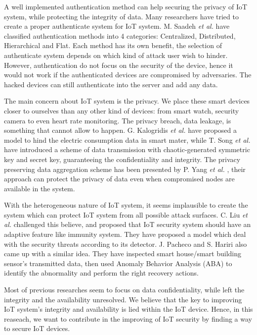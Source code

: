 A well implemented authentication method can help securing the privacy of IoT system, while protecting the integrity of data. Many researchers have tried to create a proper authenticate system for IoT system. M. Saadeh \textit{et al.}\cite{AUTH1} have classified authentication methods into 4 categories: Centralized, Distributed, Hierarchical and Flat. Each method has its own benefit, the selection of authenticate system depends on which kind of attack user wish to hinder. However, authentication do not focus on the security of the device, hence it would not work if the authenticated devices are compromised by adversaries. The hacked devices can still authenticate into the server and add any data. 

 The main concern about IoT system is the privacy. We place these smart devices closer to ourselves than any other kind of devices: from smart watch, security camera to even heart rate monitoring. The privacy breach, data leakage, is something that cannot allow to happen. G. Kalogridis \textit{et al.} \cite{PRIVACY1} have proposed a model to hind the electric consumption data in smart mater, while T. Song \textit{et al.} \cite{PRIVACY2} have introduced a scheme of data transmission with chaotic-generated symmetric key and secret key, guaranteeing the confidentiality and integrity. The privacy preserving data aggregation scheme has been presented by P. Yang \textit{et al.} \cite{PRIVACY3}, their approach can protect the privacy of data even when compromised nodes are available in the system.  

 With the heterogeneous nature of IoT system, it seems implausible to create the system which can protect IoT system from all possible attack surfaces. 
 C. Liu \textit{et al.} \cite{OTHER1} challenged this believe, and proposed that IoT security system should have an adaptive feature like immunity system. They have proposed a model which deal with the security threats according to its detector.
 J. Pacheco and S. Hariri \cite{OTHER2} also came up with a similar idea. They have inspected smart house/smart building sensor’s transmitted data, then used Anomaly Behavior Analysis (ABA) to identify the abnormality and perform the right recovery actions.  

 Most of previous researches seem to focus on data confidentiality, while left the integrity and the availability unresolved. We believe that the key to improving IoT system's integrity and availability is lied within the IoT device. Hence, in this reaseach, we  want to contribute in the improving of IoT security by finding a way to secure IoT devices. 

 
